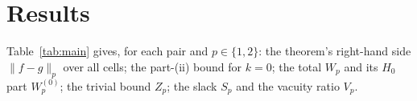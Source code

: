 \documentclass[11pt,a4paper]{article}
\begin{document}
\section{Results}
\label{sec:results}

Table~\ref{tab:main} gives, for each pair and $p\in\{1,2\}$: the theorem's right-hand side
$\|f-g\|_p$ over all cells; the part-(ii) bound for $k=0$; the total $W_p$ and its $H_0$ part
$W_p^{(0)}$; the trivial bound $Z_p$; the slack $S_p$ and the vacuity ratio $V_p$.

\begin{table}[h]\centering\small

\caption{The Skraba--Turner bound on the seven pairs, in its own metric ($\ell_p$ ground cost, full
diagrams, all degrees). $S_p=\|f-g\|_p/W_p$; $V_p=\|f-g\|_p/Z_p$, informative iff $V_p<1$.}
\label{tab:main}
\end{table}

\begin{table}[h]\centering\small

\caption{Duality certificates for $W_p^{(0)}$: relative primal--dual gap as returned, maximal
violation $\delta$ of $u_i+v_j\le C_{ij}$ over the full augmented matrix, the rigorous certified
relative gap after the $-R\delta$ shift, the scope (full diagram, or the 200 longest bars per side
where the full LP exceeded the size rule of amendment A2), and LP time.}
\label{tab:cert}
\end{table}
\end{document}
